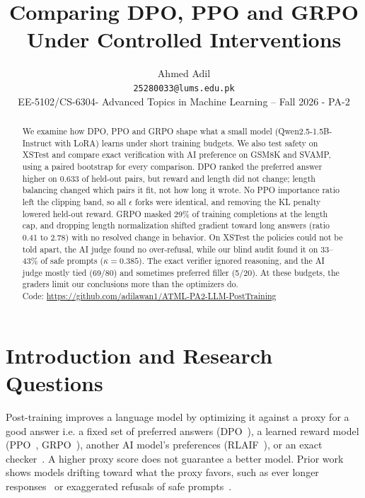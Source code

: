 \documentclass{article}
\title{Comparing DPO, PPO and GRPO Under Controlled Interventions}
\author{%
  Ahmed Adil \\
  \texttt{25280033@lums.edu.pk} \\
  EE-5102/CS-6304- Advanced Topics in Machine Learning -- Fall 2026 - PA-2
}
\begin{document}
\maketitle

\begin{abstract}
We examine how DPO, PPO and GRPO shape what a small model (Qwen2.5-1.5B-Instruct with LoRA) learns under short training budgets. We also test safety on XSTest and compare exact verification with AI preference on GSM8K and SVAMP, using a paired bootstrap for every comparison. DPO ranked the preferred answer higher on 0.633 of held-out pairs, but reward and length did not change; length balancing changed which pairs it fit, not how long it wrote. No PPO importance ratio left the clipping band, so all $\epsilon$ forks were identical, and removing the KL penalty lowered held-out reward. GRPO masked 29\% of training completions at the length cap, and dropping length normalization shifted gradient toward long answers (ratio 0.41 to 2.78) with no resolved change in behavior. On XSTest the policies could not be told apart, the AI judge found no over-refusal, while our blind audit found it on 33--43\% of safe prompts ($\kappa = 0.385$). The exact verifier ignored reasoning, and the AI judge mostly tied (69/80) and sometimes preferred filler (5/20). At these budgets, the graders limit our conclusions more than the optimizers do.\\
Code: \url{https://github.com/adilawan1/ATML-PA2-LLM-PostTraining}
\end{abstract}

\section{Introduction and Research Questions}

Post-training improves a language model by optimizing it against a proxy for a good answer i.e. a fixed set of preferred answers (DPO~\cite{rafailov2023}), a learned reward model (PPO~\cite{schulman2017,ouyang2022}, GRPO~\cite{shao2024}), another AI model's preferences (RLAIF~\cite{lee2024}), or an exact checker~\cite{deepseek2025}. A higher proxy score does not guarantee a better model. Prior work shows models drifting toward what the proxy favors, such as ever longer responses~\cite{liu2025} or exaggerated refusals of safe prompts~\cite{rottger2023}.
\end{document}
